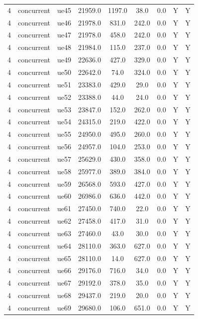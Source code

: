 \begin{table}[ht]
\begin{tabular}{|c|c|c|c|c|c|c|c|c|}
4 & concurrent & ue45 & 21959.0 & 1197.0 & 38.0 & 0.0 & Y & Y \\
4 & concurrent & ue46 & 21978.0 & 831.0 & 242.0 & 0.0 & Y & Y \\
4 & concurrent & ue47 & 21978.0 & 458.0 & 242.0 & 0.0 & Y & Y \\
4 & concurrent & ue48 & 21984.0 & 115.0 & 237.0 & 0.0 & Y & Y \\
4 & concurrent & ue49 & 22636.0 & 427.0 & 329.0 & 0.0 & Y & Y \\
4 & concurrent & ue50 & 22642.0 & 74.0 & 324.0 & 0.0 & Y & Y \\
4 & concurrent & ue51 & 23383.0 & 429.0 & 29.0 & 0.0 & Y & Y \\
4 & concurrent & ue52 & 23388.0 & 44.0 & 24.0 & 0.0 & Y & Y \\
4 & concurrent & ue53 & 23847.0 & 152.0 & 262.0 & 0.0 & Y & Y \\
4 & concurrent & ue54 & 24315.0 & 219.0 & 422.0 & 0.0 & Y & Y \\
4 & concurrent & ue55 & 24950.0 & 495.0 & 260.0 & 0.0 & Y & Y \\
4 & concurrent & ue56 & 24957.0 & 104.0 & 253.0 & 0.0 & Y & Y \\
4 & concurrent & ue57 & 25629.0 & 430.0 & 358.0 & 0.0 & Y & Y \\
4 & concurrent & ue58 & 25977.0 & 389.0 & 384.0 & 0.0 & Y & Y \\
4 & concurrent & ue59 & 26568.0 & 593.0 & 427.0 & 0.0 & Y & Y \\
4 & concurrent & ue60 & 26986.0 & 636.0 & 442.0 & 0.0 & Y & Y \\
4 & concurrent & ue61 & 27450.0 & 740.0 & 22.0 & 0.0 & Y & Y \\
4 & concurrent & ue62 & 27458.0 & 417.0 & 31.0 & 0.0 & Y & Y \\
4 & concurrent & ue63 & 27460.0 & 43.0 & 30.0 & 0.0 & Y & Y \\
4 & concurrent & ue64 & 28110.0 & 363.0 & 627.0 & 0.0 & Y & Y \\
4 & concurrent & ue65 & 28110.0 & 14.0 & 627.0 & 0.0 & Y & Y \\
4 & concurrent & ue66 & 29176.0 & 716.0 & 34.0 & 0.0 & Y & Y \\
4 & concurrent & ue67 & 29192.0 & 378.0 & 35.0 & 0.0 & Y & Y \\
4 & concurrent & ue68 & 29437.0 & 219.0 & 20.0 & 0.0 & Y & Y \\
4 & concurrent & ue69 & 29680.0 & 106.0 & 651.0 & 0.0 & Y & Y \\

\end{tabular}
\end{table}
